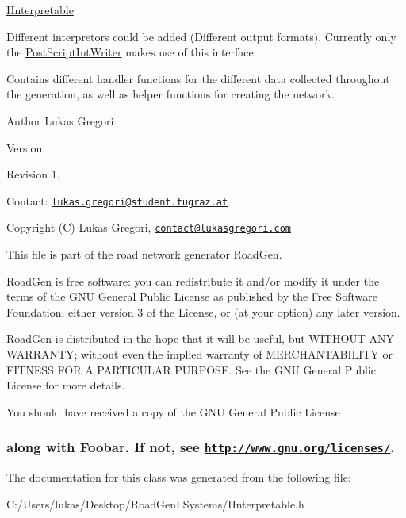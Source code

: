 \hyperlink{class_i_interpretable}{I\+Interpretable}

Different interpretors could be added (Different output formats). Currently only the \hyperlink{class_post_script_int_writer}{Post\+Script\+Int\+Writer} makes use of this interface

Contains different handler functions for the different data collected throughout the generation, as well as helper functions for creating the network.

\begin{DoxyAuthor}{Author}
Lukas Gregori 
\end{DoxyAuthor}
\begin{DoxyVersion}{Version}

\end{DoxyVersion}
\begin{DoxyParagraph}{Revision}
1. 
\end{DoxyParagraph}


Contact\+: \href{mailto:lukas.gregori@student.tugraz.at}{\tt lukas.\+gregori@student.\+tugraz.\+at}



 Copyright (C) Lukas Gregori, \href{mailto:contact@lukasgregori.com}{\tt contact@lukasgregori.\+com}

This file is part of the road network generator Road\+Gen.

Road\+Gen is free software\+: you can redistribute it and/or modify it under the terms of the G\+NU General Public License as published by the Free Software Foundation, either version 3 of the License, or (at your option) any later version.

Road\+Gen is distributed in the hope that it will be useful, but W\+I\+T\+H\+O\+UT A\+NY W\+A\+R\+R\+A\+N\+TY; without even the implied warranty of M\+E\+R\+C\+H\+A\+N\+T\+A\+B\+I\+L\+I\+TY or F\+I\+T\+N\+E\+SS F\+OR A P\+A\+R\+T\+I\+C\+U\+L\+AR P\+U\+R\+P\+O\+SE. See the G\+NU General Public License for more details.

You should have received a copy of the G\+NU General Public License \subsubsection*{along with Foobar. If not, see \href{http://www.gnu.org/licenses/}{\tt http\+://www.\+gnu.\+org/licenses/}. }

The documentation for this class was generated from the following file\+:\begin{DoxyCompactItemize}
\item 
C\+:/\+Users/lukas/\+Desktop/\+Road\+Gen\+L\+Systems/I\+Interpretable.\+h\end{DoxyCompactItemize}
